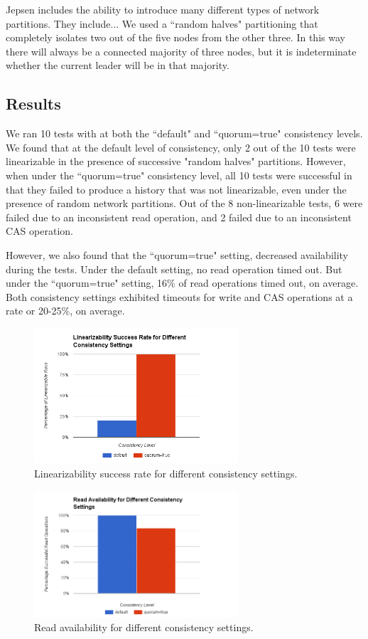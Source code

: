 \documentclass[12pt,conference]{IEEEtran}
\begin{document}
Jepsen includes the ability to introduce many different types of network partitions. They include... We used a ``random halves" partitioning that completely isolates two out of the five nodes from the other three. In this way there will always be a connected majority of three nodes, but it is indeterminate whether the current leader will be in that majority.

\subsection{Results}
We ran 10 tests with at both the ``default" and ``quorum=true" consistency levels. We found that at the default level of consistency, only 2 out of the 10 tests were linearizable in the presence of successive "random halves" partitions. However, when under the ``quorum=true" consistency level, all 10 tests were successful in that they failed to produce a history that was not linearizable, even under the presence of random network partitions. Out of the 8 non-linearizable tests, 6 were failed due to an inconsistent read operation, and 2 failed due to an inconsistent CAS operation.

However, we also found that the ``quorum=true" setting, decreased availability during the tests. Under the default setting, no read operation timed out. But under the ``quorum=true" setting, 16\% of read operations timed out, on average. Both consistency settings exhibited timeouts for write and CAS operations at a rate or 20-25\%, on average.

\begin{figure}[!t]
\centering
\includegraphics[width=3in]{images/overallresults}
\caption{Linearizability success rate for different consistency settings.}
\label{overallResultsFigure}
\end{figure}

\begin{figure}[!t]
\centering
\includegraphics[width=3in]{images/availabilityresults}
\caption{Read availability for different consistency settings.}
\label{availabilityResultsFigure}
\end{figure}
\end{document}
